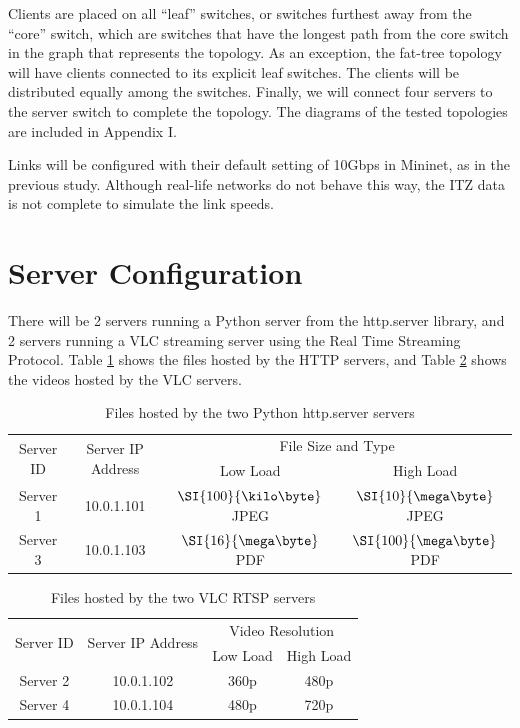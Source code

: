 Clients are placed on all ``leaf'' switches, or switches furthest away from the ``core'' switch, which are switches that have the longest path from the core switch in the graph that represents the topology. As an exception, the fat-tree topology will have clients connected to its explicit leaf switches. The clients will be distributed equally among the switches. Finally, we will connect four servers to the server switch to complete the topology. The diagrams of the tested topologies are included in Appendix I.

Links will be configured with their default setting of 10Gbps in Mininet, as in the previous study. Although real-life networks do not behave this way, the ITZ data is not complete to simulate the link speeds.

\section{Server Configuration}
There will be 2 servers running a Python server from the http.server library, and 2 servers running a VLC streaming server using the Real Time Streaming Protocol. Table \ref{tab:httpserverconfig} shows the files hosted by the HTTP servers, and Table \ref{tab:vlcconfig} shows the videos hosted by the VLC servers.

\begin{table}[htbp]
    \centering
    \begin{tabular}{cccc}
        \toprule
        \multirow{2}{*}{Server ID} & \multirow{2}{*}{Server IP Address} & \multicolumn{2}{c}{File Size and Type} \\
         &  & Low Load & High Load \\
        \midrule
        Server 1 & 10.0.1.101 & $\SI{100}{\kilo\byte}$ JPEG & $\SI{10}{\mega\byte}$ JPEG \\
        Server 3 & 10.0.1.103 & $\SI{16}{\mega\byte}$ PDF & $\SI{100}{\mega\byte}$ PDF  \\
        \bottomrule
    \end{tabular}
    \caption{Files hosted by the two Python http.server servers}
    \label{tab:httpserverconfig}
\end{table}

\begin{table}[htbp]
    \centering
    \begin{tabular}{cccc}
        \toprule
        \multirow{2}{*}{Server ID} & \multirow{2}{*}{Server IP Address} & \multicolumn{2}{c}{Video Resolution} \\
         &  & Low Load & High Load \\
        \midrule
        Server 2 & 10.0.1.102 & 360p & 480p \\
        Server 4 & 10.0.1.104 & 480p & 720p  \\
        \bottomrule
    \end{tabular}
    \caption{Files hosted by the two VLC RTSP servers}
    \label{tab:vlcconfig}
\end{table}

